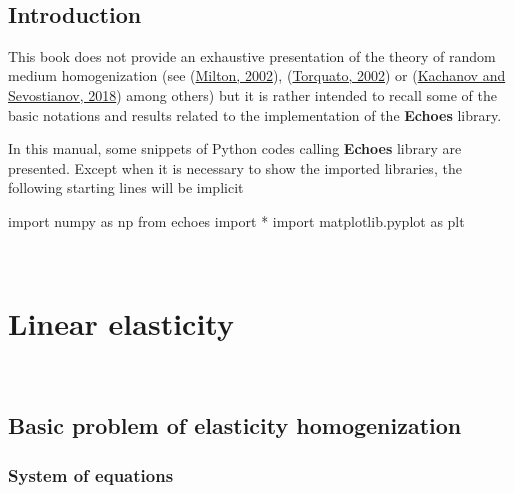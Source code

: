 \documentclass[
  letterpaper,
  DIV=11,
  numbers=noendperiod]{scrreprt}
\newenvironment{Shaded}{\begin{snugshade}}{\end{snugshade}}
\newcommand{\ImportTok}[1]{\textcolor[rgb]{0.00,0.46,0.62}{#1}}
\newcommand{\NormalTok}[1]{\textcolor[rgb]{0.00,0.23,0.31}{#1}}
\newcommand{\OperatorTok}[1]{\textcolor[rgb]{0.37,0.37,0.37}{#1}}
\begin{document}
\(\,\)


\hypertarget{sec-intro}{%
\chapter*{Introduction}\label{sec-intro}}


This book does not provide an exhaustive presentation of the theory of
random medium homogenization (see
(\protect\hyperlink{ref-milton2002}{Milton, 2002}),
(\protect\hyperlink{ref-torquato2002}{Torquato, 2002}) or
(\protect\hyperlink{ref-kachanov2018}{Kachanov and Sevostianov, 2018})
among others) but it is rather intended to recall some of the basic
notations and results related to the implementation of the
\textbf{Echoes} library.

In this manual, some snippets of Python codes calling \textbf{Echoes}
library are presented. Except when it is necessary to show the imported
libraries, the following starting lines will be implicit

\begin{Shaded}
\begin{Highlighting}[]
\ImportTok{import}\NormalTok{ numpy }\ImportTok{as}\NormalTok{ np}
\ImportTok{from}\NormalTok{ echoes }\ImportTok{import} \OperatorTok{*}
\ImportTok{import}\NormalTok{ matplotlib.pyplot }\ImportTok{as}\NormalTok{ plt}
\end{Highlighting}
\end{Shaded}

\(\,\)

\part{Linear elasticity}

\(\,\)

\hypertarget{sec-basics_elas}{%
\chapter{Basic problem of elasticity
homogenization}\label{sec-basics_elas}}

\hypertarget{sec-basics_elas_sys_eq}{%
\section{System of equations}\label{sec-basics_elas_sys_eq}}
\end{document}
